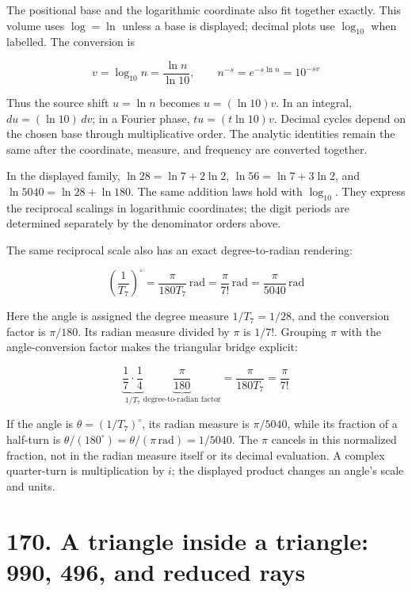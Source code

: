 \documentclass[
  11pt,
]{book}
\begin{document}
The positional base and the logarithmic coordinate also fit together
exactly. This volume uses \(\log=\ln\) unless a base is displayed;
decimal plots use \(\log_{10}\) when labelled. The conversion is

\[
\boxed{v=\log_{10}n=\frac{\ln n}{\ln10},\qquad
n^{-s}=e^{-s\ln n}=10^{-sv}}
\tag{4A.4}
\]

Thus the source shift \(u=\ln n\) becomes \(u=(\ln10)v\). In an
integral, \(du=(\ln10)\,dv\); in a Fourier phase, \(tu=(t\ln10)v\).
Decimal cycles depend on the chosen base through multiplicative order.
The analytic identities remain the same after the coordinate, measure,
and frequency are converted together.

In the displayed family, \(\ln28=\ln7+2\ln2\), \(\ln56=\ln7+3\ln2\), and
\(\ln5040=\ln28+\ln180\). The same addition laws hold with
\(\log_{10}\). They express the reciprocal scalings in logarithmic
coordinates; the digit periods are determined separately by the
denominator orders above.

The same reciprocal scale also has an exact degree-to-radian rendering:

\[
\boxed{\left(\frac1{T_7}\right)^\circ
=\frac{\pi}{180T_7}\,\mathrm{rad}
=\frac{\pi}{7!}\,\mathrm{rad}
=\frac{\pi}{5040}\,\mathrm{rad}}
\tag{4A.5}
\]

Here the angle is assigned the degree measure \(1/T_7=1/28\), and the
conversion factor is \(\pi/180\). Its radian measure divided by \(\pi\)
is \(1/7!\). Grouping \(\pi\) with the angle-conversion factor makes the
triangular bridge explicit:

\[
\underbrace{\frac17\cdot\frac14}_{1/T_7}
\underbrace{\frac{\pi}{180}}_{\text{degree-to-radian factor}}
=\frac{\pi}{180T_7}=\frac{\pi}{7!}
\tag{4A.6}
\]

If the angle is \(\theta=(1/T_7)^\circ\), its radian measure is
\(\pi/5040\), while its fraction of a half-turn is
\(\theta/(180^\circ)=\theta/(\pi\,\mathrm{rad})=1/5040\). The \(\pi\)
cancels in this normalized fraction, not in the radian measure itself or
its decimal evaluation. A complex quarter-turn is multiplication by
\(i\); the displayed product changes an angle's scale and units.

\section{170. A triangle inside a triangle: 990, 496, and reduced
rays}\label{a-triangle-inside-a-triangle-990-496-and-reduced-rays}
\end{document}

